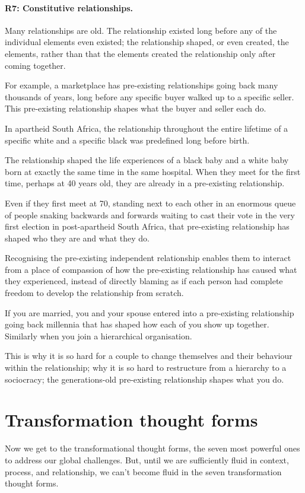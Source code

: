 \paragraph{\textbf{R7: Constitutive relationships.}}
Many relationships are old. The relationship existed long before any of the individual elements even existed; the relationship shaped, or even created, the elements, rather than that the elements created the relationship only after coming together.


For example, a marketplace has pre-existing relationships going back many thousands of years, long before any specific buyer walked up to a specific seller. This pre-existing relationship shapes what the buyer and seller each do.


In apartheid South Africa, the relationship throughout the entire lifetime of a specific white and a specific black was predefined long before birth. 


The relationship shaped the life experiences of a black baby and a white baby born at exactly the same time in the same hospital. When they meet for the first time, perhaps at 40 years old, they are already in a pre-existing relationship. 


Even if they first meet at 70, standing next to each other in an enormous queue of people snaking backwards and forwards waiting to cast their vote in the very first election in post-apartheid South Africa,  that pre-existing relationship has shaped who they are and what they do.


Recognising the pre-existing independent relationship enables them to interact from a place of compassion of how the pre-existing relationship has caused what they experienced, instead of directly blaming as if each person had complete freedom to develop the relationship from scratch.


If you are married, you and your spouse entered into a pre-existing relationship going back millennia that has shaped how each of you show up together. Similarly when you join a hierarchical organisation.


This is why it is so hard for a couple to change themselves and their behaviour within the relationship; why it is so hard to restructure from a hierarchy to a sociocracy; the generations-old pre-existing relationship shapes what you do.




\section{Transformation thought forms}
Now we get to the transformational thought forms, the seven most powerful ones to address our global challenges. But, until we are sufficiently fluid in context, process, and relationship, we can't become fluid in the seven transformation thought forms.


